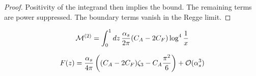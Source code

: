 \begin{proof}
Positivity of the integrand then implies the bound. The remaining terms
are power suppressed. The boundary terms vanish in the Regge limit.
\end{proof}

\begin{equation}
  \mathcal{M}^{(2)} = \int_0^1 dz \, \frac{\alpha_s}{2\pi} (C_A - 2C_F) \log^{4} \frac{1}{x}
  \label{eq:4}
\end{equation}

\begin{equation}
  F(z) = \frac{\alpha_s}{4\pi} \left( (C_A - 2C_F) \zeta_{3} - C_A \frac{\pi^2}{6} \right) + \mathcal{O}(\alpha_s^{3})
  \label{eq:5}
\end{equation}

